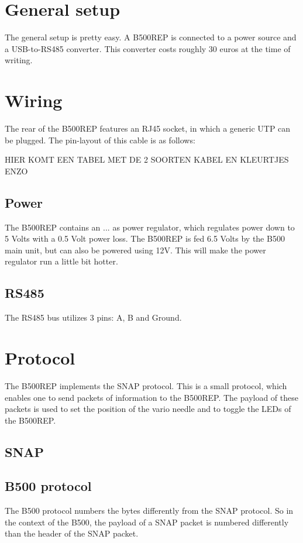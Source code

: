 \documentclass{article}
\begin{document}
\section{General setup}
The general setup is pretty easy. A B500REP is connected to a power source and a USB-to-RS485 converter. This converter costs roughly 30 euros at the time of writing.

\section{Wiring}
The rear of the B500REP features an RJ45 socket, in which a generic UTP can be plugged. The pin-layout of this cable is as follows:

HIER KOMT EEN TABEL MET DE 2 SOORTEN KABEL EN KLEURTJES ENZO

\subsection{Power}
The B500REP contains an ... as power regulator, which regulates power down to 5 Volts with a 0.5 Volt power loss. The B500REP is fed 6.5 Volts by the B500 main unit, but can also be powered using 12V. This will make the power regulator run a little bit hotter.

\subsection{RS485}
The RS485 bus utilizes 3 pins: A, B and Ground. 

\section{Protocol}
The B500REP implements the SNAP protocol. This is a small protocol, which enables one to send packets of information to the B500REP. The payload of these packets is used to set the position of the vario needle and to toggle the LEDs of the B500REP.

\subsection{SNAP}
\subsection{B500 protocol}
The B500 protocol numbers the bytes differently from the SNAP protocol. So in the context of the B500, the payload of a SNAP packet is numbered differently than the header of the SNAP packet.
\end{document}

